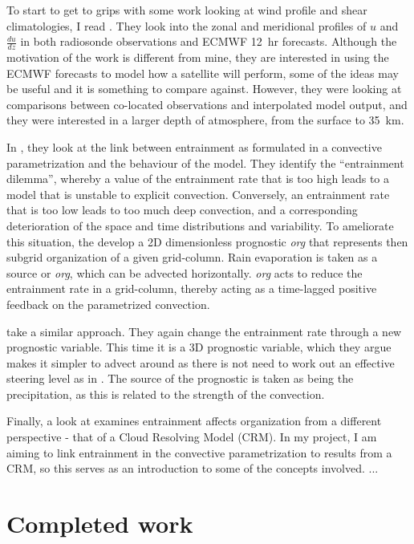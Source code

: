 \documentclass[11pt,a4paper]{article}
\begin{document}
To start to get to grips with some work looking at wind profile and shear climatologies, I read \cite{houchi2010comparison}. They look into the zonal and meridional profiles of $u$ and $\frac{du}{dz}$ in both radiosonde observations and ECMWF \SI{12}{hr} forecasts. Although the motivation of the work is different from mine, they are interested in using the ECMWF forecasts to model how a satellite will perform, some of the ideas may be useful and it is something to compare against. However, they were looking at comparisons between co-located observations and interpolated model output, and they were interested in a larger depth of atmosphere, from the surface to \SI{35}{km}.

In \cite{mapes2011parameterizing}, they look at the link between entrainment as formulated in a convective parametrization and the behaviour of the model. They identify the ``entrainment dilemma'', whereby a value of the entrainment rate that is too high leads to a model that is unstable to explicit convection. Conversely, an entrainment rate that is too low leads to too much deep convection, and a corresponding deterioration of the space and time distributions and variability. To ameliorate this situation, the develop a 2D dimensionless prognostic \textit{org} that represents then subgrid organization of a given grid-column. Rain evaporation is taken as a source or \textit{org}, which can be advected horizontally. \textit{org} acts to reduce the entrainment rate in a grid-column, thereby acting as a time-lagged positive feedback on the parametrized convection. 

\cite{willett2017simple} take a similar approach. They again change the entrainment rate through a new prognostic variable. This time it is a 3D prognostic variable, which they argue makes it simpler to advect around as there is not need to work out an effective steering level as in \cite{mapes2011parameterizing}. The source of the prognostic is taken as being the precipitation, as this is related to the strength of the convection.

Finally, a look at \cite{tompkins2017organization} examines entrainment affects organization from a different perspective - that of a Cloud Resolving Model (CRM). In my project, I am aiming to link entrainment in the convective parametrization to results from a CRM, so this serves as an introduction to some of the concepts involved. ...

\section{Completed work}
\label{sec:Completed work}
\end{document}
